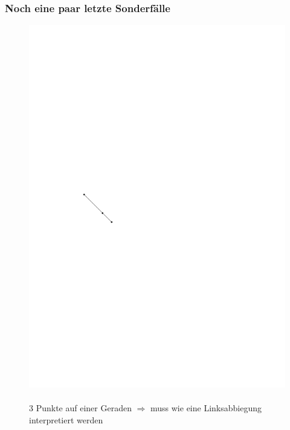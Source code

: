 \begin{frame}
	\frametitle{{Noch eine paar letzte Sonderfälle}}
\begin{figure}[htbp]
  \centering
  \begin{minipage}[b]{.4\linewidth}
    \includegraphics[width=\linewidth]{bilder/sonderfall1}
    \\
    \\
    \tiny{3 Punkte auf einer Geraden $\Rightarrow$ muss wie eine Linksabbiegung interpretiert werden}
  \end{minipage}
  \hfill
  \pause
  \begin{minipage}[b]{.4\linewidth}

\end{minipage}
\end{figure}
\end{frame}

